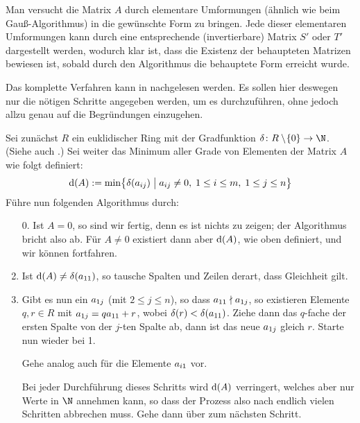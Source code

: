 \begin{proofsketch}
    Man versucht die Matrix $A$ durch elementare Umformungen (ähnlich wie beim
    Gauß-Algorithmus) in die gewünschte Form zu bringen. Jede dieser elementaren
    Umformungen kann durch eine entsprechende (invertierbare) Matrix $S'$ oder
    $T'$ dargestellt werden, wodurch klar ist, dass die Existenz der behaupteten
    Matrizen bewiesen ist, sobald durch den Algorithmus die behauptete Form
    erreicht wurde.
    
    Das komplette Verfahren kann in \cite[S.\,211, Lemma~5]{bookc:bosch08}
    nachgelesen werden. Es sollen hier deswegen nur die nötigen Schritte
    angegeben werden, um es durchzuführen, ohne jedoch allzu genau auf die
    Begründungen einzugehen.
    
    Sei zunächst $R$ ein euklidischer Ring mit der Gradfunktion
    $\delta\colon R\setminus\!\{0\}\to\N$. 
    (Siehe auch \cite[Def.~4]{talk:rief}.) 
    Sei weiter das Minimum aller Grade von Elementen der Matrix $A$ wie folgt
    definiert:
    \[ \mathrm{d}(A) := \min\bigl\{ \delta(a_{ij}) \;\big\vert\; a_{ij}\neq0,\;
                            1\leq i\leq m, \; 1\leq j\leq n \bigr\}    \]
    Führe nun folgenden Algorithmus durch:
    \begin{enumerate}[1.]
        \item[0.]
            Ist $A=0$, so sind wir fertig, denn es ist nichts zu zeigen;
            der Algorithmus bricht also ab.
            Für $A\neq0$ existiert dann aber $\mathrm{d}(A)$, wie oben definiert, und
            wir können fortfahren.
            
        \item 
            Ist $\mathrm{d}(A) \neq \delta(a_{11})$, so tausche Spalten und Zeilen
            derart, dass Gleichheit gilt.
            
        \item
            Gibt es nun ein $a_{1j}$ (mit $2\leq j\leq n$), so dass 
            $a_{11} \nmid a_{1j}$, so existieren Elemente $q,r\in R$ mit $a_{1j} =
            qa_{11} + r$, wobei $\delta(r) < \delta(a_{11})$. Ziehe dann das
            $q$-fache der ersten Spalte von der $j$-ten Spalte ab, dann ist das
            neue $a_{1j}$ gleich $r$. Starte nun wieder bei 1.
            
            Gehe analog auch für die Elemente $a_{i1}$ vor.
            
            Bei jeder Durchführung dieses Schritts wird $\mathrm{d}(A)$ verringert,
            welches aber nur Werte in $\N$ annehmen kann, so dass der Prozess
            also nach endlich vielen Schritten abbrechen muss. Gehe dann über
            zum nächsten Schritt.
            

\end{enumerate}
\end{proofsketch}
